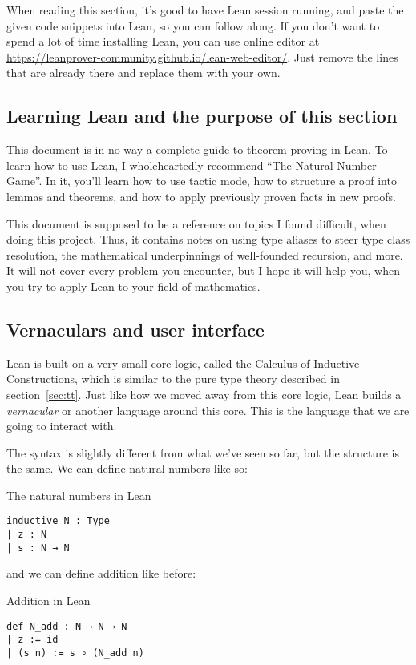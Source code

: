 \documentclass[a4paper, 12pt]{article}
\theoremstyle{changedot}
\theoremstyle{changedotbreak}
\theoremstyle{nonumberplain}
\begin{document}
When reading this section, it's good to have Lean session running, and paste the given code snippets into Lean, so you can follow along. If you don't want to spend a lot of time installing Lean, you can use online editor at \url{https://leanprover-community.github.io/lean-web-editor/}. Just remove the lines that are already there and replace them with your own.

\subsection{Learning Lean and the purpose of this section}
This document is in no way a complete guide to theorem proving in Lean. To learn how to use Lean, I wholeheartedly recommend ``The Natural Number Game''\cite{natnumgame}. In it, you'll learn how to use tactic mode, how to structure a proof into lemmas and theorems, and how to apply previously proven facts in new proofs.

This document is supposed to be a reference on topics I found difficult, when doing this project. Thus, it contains notes on using type aliases to steer type class resolution, the mathematical underpinnings of well-founded recursion, and more. It will not cover every problem you encounter, but I hope it will help you, when you try to apply Lean to your field of mathematics.

\subsection{Vernaculars and user interface}
Lean is built on a very small core logic, called the Calculus of Inductive Constructions, which is similar to the pure type theory described in section~\ref{sec:tt}. Just like how we moved away from this core logic, Lean builds a \textit{vernacular} or another language around this core. This is the language that we are going to interact with.

The syntax is slightly different from what we've seen so far, but the structure is the same. We can define natural numbers like so:

\begin{definition}
  The natural numbers in Lean
\begin{verbatim}
inductive N : Type
| z : N
| s : N → N
\end{verbatim}
\end{definition}

and we can define addition like before:

\begin{definition}
  Addition in Lean
\begin{verbatim}
def N_add : N → N → N
| z := id
| (s n) := s ∘ (N_add n)
\end{verbatim}
\end{definition}
\end{document}
